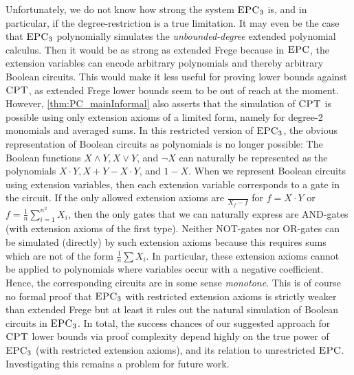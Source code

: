 \documentclass[a4paper,UKenglish,cleveref, autoref, thm-restate]{lipics-v2021}
\newcommand{\CPT}{\mbox{\sc CPT}}
\newcommand{\EPC}{\mbox{\sc EPC}}
\begin{document}
	Unfortunately, we do not know how strong the system $\EPC_3$ is, and in particular, if the degree-restriction is a true limitation. It may even be the case that $\EPC_3$ polynomially simulates the \emph{unbounded-degree} extended polynomial calculus. Then it would be as strong as extended Frege because in $\EPC$, the extension variables can encode arbitrary polynomials and thereby arbitrary Boolean circuits. This would make it less useful for proving lower bounds against $\CPT$, as extended Frege lower bounds seem to be out of reach at the moment.\\
	However, \autoref{thm:PC_mainInformal} also asserts that the simulation of $\CPT$ is possible using only extension axioms of a limited form, namely for degree-2 monomials and averaged sums. In this restricted version of $\EPC_3$, the obvious representation of Boolean circuits as polynomials is no longer possible: The Boolean functions $X \land Y, X \lor Y$, and $\neg X$ can naturally be represented as the polynomials $X \cdot Y, X + Y - X \cdot Y$, and $1-X$. When we represent Boolean circuits using extension variables, then each extension variable corresponds to a gate in the circuit. If the only allowed extension axioms are $\frac{}{X_f - f}$ for $f = X \cdot Y$ or $f = \frac{1}{n} \sum_{i=1}^{n^2} X_i$, then the only gates that we can naturally express are AND-gates (with extension axioms of the first type). Neither NOT-gates nor OR-gates can be simulated (directly) by such extension axioms because this requires sums which are not of the form $\frac{1}{n} \sum X_i$. In particular, these extension axioms cannot be applied to polynomials where variables occur with a negative coefficient. Hence, the corresponding circuits are in some sense \emph{monotone}. This is of course no formal proof that $\EPC_3$ with restricted extension axioms is strictly weaker than extended Frege but at least it rules out the natural simulation of Boolean circuits in $\EPC_3$. In total, the success chances of our suggested approach for $\CPT$ lower bounds via proof complexity depend highly on the true power of $\EPC_3$ (with restricted extension axioms), and its relation to unrestricted $\EPC$. Investigating this remains a problem for future work.\\
	
\end{document}
